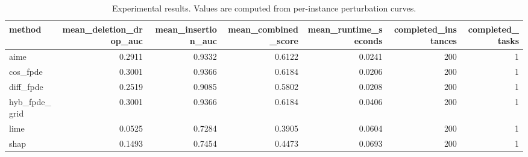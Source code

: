 \begin{table}[t]
\caption{Experimental results. Values are computed from per-instance perturbation curves.}
\label{tab:main_results_computed}
\centering
\begin{tabular}{lrrrrrr}
\toprule
method & mean\_deletion\_drop\_auc & mean\_insertion\_auc & mean\_combined\_score & mean\_runtime\_seconds & completed\_instances & completed\_tasks \\
\midrule
aime & 0.2911 & 0.9332 & 0.6122 & 0.0241 & 200 & 1 \\
cos\_fpde & 0.3001 & 0.9366 & 0.6184 & 0.0206 & 200 & 1 \\
diff\_fpde & 0.2519 & 0.9085 & 0.5802 & 0.0208 & 200 & 1 \\
hyb\_fpde\_grid & 0.3001 & 0.9366 & 0.6184 & 0.0406 & 200 & 1 \\
lime & 0.0525 & 0.7284 & 0.3905 & 0.0604 & 200 & 1 \\
shap & 0.1493 & 0.7454 & 0.4473 & 0.0693 & 200 & 1 \\
\bottomrule
\end{tabular}

\end{table}
